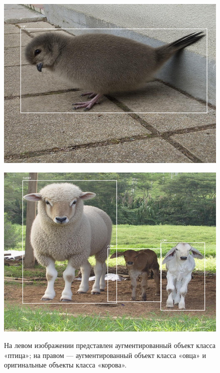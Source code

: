 \begin{figure}[htp]
  \centering
  \begin{minipage}[t]{0.4\textwidth}
    \centering
    \includegraphics[width=\linewidth]
    {images/aug_000036_with_all.png}
    \label{fig:img2}
  \end{minipage}%
  \hspace{0.05\textwidth}%
  \begin{minipage}[t]{0.4\textwidth}
    \centering
    \includegraphics[width=\linewidth]{images/aug_001299.png}
    \label{fig:img2}
  \end{minipage}

  \caption{На левом изображении представлен аугментированный объект класса «птица»; на правом — аугментированный объект класса «овца» и оригинальные объекты класса «корова».}
  \label{fig:comparison}
\end{figure}

